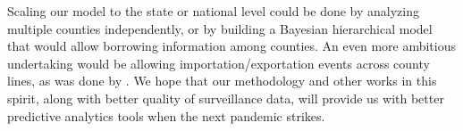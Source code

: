 Scaling our model to the state or national level could be done by analyzing multiple counties independently, or by building a Bayesian hierarchical model that would allow borrowing information among counties.
An even more ambitious undertaking would be allowing importation/exportation events across county lines, as was done by \citet{pei2021burden}. We hope that our methodology and other works in this spirit, along with better quality of surveillance data, will provide us with better predictive analytics tools when the next pandemic strikes.